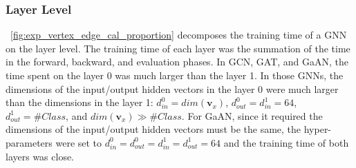\subsubsection{Layer Level}
\label{sec:time_breakdown_analysis_layer_level}

\figurename~\ref{fig:exp_vertex_edge_cal_proportion} decomposes the training time of a GNN on the layer level.
%
The training time of each layer was the summation of the time in the forward, backward, and evaluation phases.
%
In GCN, GAT, and GaAN, the time spent on the layer 0 was much larger than the layer 1.
%
In those GNNs, the dimensions of the input/output hidden vectors in the layer 0 were much larger than the dimensions in the layer 1: $d^0_{in}=dim(\boldsymbol{v}_x)$, $d^0_{out}=d^1_{in}=64$, $d^1_{out}=\#Class$, and $dim(\boldsymbol{v}_x) \gg \#Class$.
%
For GaAN, since it required the dimensions of the input/output hidden vectors must be the same, the hyper-parameters were set to $d^0_{in}=d^0_{out}=d^1_{in}=d^1_{out}=64$ and the training time of both layers was close.

